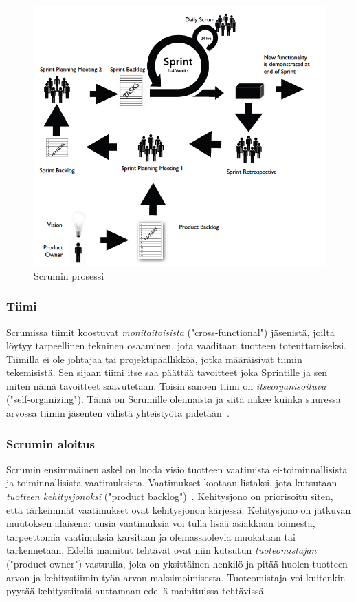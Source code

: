 \documentclass[finnish]{../tktltiki2}
\theoremstyle{definition}
\theoremstyle{remark}
\begin{document}
\begin{figure}[ht]
     \includegraphics{scrum.png}
     \caption{Scrumin prosessi~\cite{Scrumprimer}}
\end{figure}

\subsubsection{Tiimi}

Scrumissa tiimit koostuvat \emph{monitaitoisista} ("cross-functional") 
jäsenistä, joilta löytyy tarpeellinen tekninen osaaminen, jota 
vaaditaan
tuotteen toteuttamiseksi. Tiimillä ei ole johtajaa tai 
projektipäällikköä, jotka määräisivät tiimin tekemisistä. Sen sijaan 
tiimi itse
saa päättää tavoitteet joka Sprintille ja sen miten nämä tavoitteet 
saavutetaan. Toisin sanoen tiimi on \emph{itseorganisoituva}
("self-organizing"). Tämä on Scrumille olennaista ja siitä näkee 
kuinka suuressa arvossa tiimin jäsenten välistä yhteistyötä 
pidetään~\cite{ScrumHandBook}.

\subsubsection{Scrumin aloitus}

Scrumin ensimmäinen askel on luoda visio tuotteen vaatimista
ei-toiminnallisista ja toiminnallisista vaatimuksista. Vaatimukset
kootaan listaksi, jota kutsutaan \emph{tuotteen kehitysjonoksi} ("product backlog")~\cite{ScrumFinnishGuide}. Kehitysjono on priorisoitu siten, että tärkeimmät vaatimukset ovat kehitysjonon kärjessä. Kehitysjono on jatkuvan muutoksen alaisena: uusia vaatimuksia
voi tulla lisää asiakkaan toimesta, tarpeettomia vaatimuksia karsitaan ja olemassaolevia muokataan tai tarkennetaan. Edellä mainitut tehtävät
ovat niin kutsutun \emph{tuoteomistajan} ("product owner") vastuulla,
joka on yksittäinen henkilö ja pitää huolen tuotteen arvon ja kehitystiimin työn arvon maksimoimisesta. Tuoteomistaja voi kuitenkin pyytää kehitystiimiä auttamaan edellä mainituissa tehtävissä.
\end{document}
